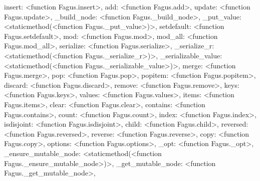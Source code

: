 \documentclass[a4paper,10pt,english]{sphinxmanual}
\begin{document}
\begin{fulllineitems}
\begin{fulllineitems}
\textquotesingle{}insert\textquotesingle{}: \textless{}function Fagus.insert\textgreater{}, \textquotesingle{}add\textquotesingle{}: \textless{}function Fagus.add\textgreater{}, \textquotesingle{}update\textquotesingle{}: \textless{}function Fagus.update\textgreater{}, \textquotesingle{}\_build\_node\textquotesingle{}: \textless{}function Fagus.\_build\_node\textgreater{}, \textquotesingle{}\_put\_value\textquotesingle{}: \textless{}staticmethod(\textless{}function Fagus.\_put\_value\textgreater{})\textgreater{}, \textquotesingle{}setdefault\textquotesingle{}: \textless{}function Fagus.setdefault\textgreater{}, \textquotesingle{}mod\textquotesingle{}: \textless{}function Fagus.mod\textgreater{}, \textquotesingle{}mod\_all\textquotesingle{}: \textless{}function Fagus.mod\_all\textgreater{}, \textquotesingle{}serialize\textquotesingle{}: \textless{}function Fagus.serialize\textgreater{}, \textquotesingle{}\_serialize\_r\textquotesingle{}: \textless{}staticmethod(\textless{}function Fagus.\_serialize\_r\textgreater{})\textgreater{}, \textquotesingle{}\_serializable\_value\textquotesingle{}: \textless{}staticmethod(\textless{}function Fagus.\_serializable\_value\textgreater{})\textgreater{}, \textquotesingle{}merge\textquotesingle{}: \textless{}function Fagus.merge\textgreater{}, \textquotesingle{}pop\textquotesingle{}: \textless{}function Fagus.pop\textgreater{}, \textquotesingle{}popitem\textquotesingle{}: \textless{}function Fagus.popitem\textgreater{}, \textquotesingle{}discard\textquotesingle{}: \textless{}function Fagus.discard\textgreater{}, \textquotesingle{}remove\textquotesingle{}: \textless{}function Fagus.remove\textgreater{}, \textquotesingle{}keys\textquotesingle{}: \textless{}function Fagus.keys\textgreater{}, \textquotesingle{}values\textquotesingle{}: \textless{}function Fagus.values\textgreater{}, \textquotesingle{}items\textquotesingle{}: \textless{}function Fagus.items\textgreater{}, \textquotesingle{}clear\textquotesingle{}: \textless{}function Fagus.clear\textgreater{}, \textquotesingle{}contains\textquotesingle{}: \textless{}function Fagus.contains\textgreater{}, \textquotesingle{}count\textquotesingle{}: \textless{}function Fagus.count\textgreater{}, \textquotesingle{}index\textquotesingle{}: \textless{}function Fagus.index\textgreater{}, \textquotesingle{}isdisjoint\textquotesingle{}: \textless{}function Fagus.isdisjoint\textgreater{}, \textquotesingle{}child\textquotesingle{}: \textless{}function Fagus.child\textgreater{}, \textquotesingle{}reversed\textquotesingle{}: \textless{}function Fagus.reversed\textgreater{}, \textquotesingle{}reverse\textquotesingle{}: \textless{}function Fagus.reverse\textgreater{}, \textquotesingle{}copy\textquotesingle{}: \textless{}function Fagus.copy\textgreater{}, \textquotesingle{}options\textquotesingle{}: \textless{}function Fagus.options\textgreater{}, \textquotesingle{}\_opt\textquotesingle{}: \textless{}function Fagus.\_opt\textgreater{}, \textquotesingle{}\_ensure\_mutable\_node\textquotesingle{}: \textless{}staticmethod(\textless{}function Fagus.\_ensure\_mutable\_node\textgreater{})\textgreater{}, \textquotesingle{}\_get\_mutable\_node\textquotesingle{}: \textless{}function Fagus.\_get\_mutable\_node\textgreater{}, 
\end{fulllineitems}
\end{fulllineitems}
\end{document}
